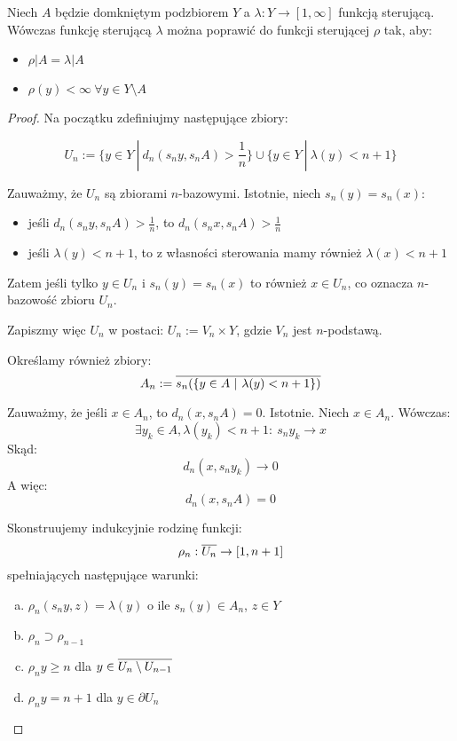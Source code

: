 \begin{thm}
Niech $A$ będzie domkniętym podzbiorem $Y$ a $\lambda: Y \rightarrow [1,\infty]$ funkcją sterującą. Wówczas funkcję sterującą $\lambda$ można poprawić do funkcji sterującej $\rho$ tak, aby:
\begin{itemize}
  \item $\rho|A = \lambda|A$
  \item $\rho(y) < \infty\ \forall y \in Y \setminus A$
\end{itemize}

\begin{proof}
  
  Na początku zdefiniujmy następujące zbiory:
  
  $$U_n := \{y \in Y\ |\ d_n(s_n y, s_n A) > \frac{1}{n}\} \cup \{y \in Y\ |\ \lambda(y) < n+1\}$$
  
  Zauważmy, że $U_n$ są zbiorami $n$-bazowymi. Istotnie, niech $s_n(y) = s_n(x)$:
  \begin{itemize}
    \item jeśli $d_n(s_n y, s_n A) > \frac{1}{n}$, to $d_n(s_n x, s_n A) > \frac{1}{n}$
    \item jeśli $\lambda(y) < n+1$, to z własności sterowania mamy również $\lambda(x) < n+1$
  \end{itemize}
  Zatem jeśli tylko $y \in U_n$ i $s_n(y) = s_n(x)$ to również $x \in U_n$, co oznacza $n$-bazowość zbioru $U_n$.
  
  Zapiszmy więc $U_n$ w postaci: $U_n := V_n \times Y$, gdzie $V_n$ jest $n$-podstawą.
  
  Określamy również zbiory:
  $$A_n := \overline{s_n({\{y \in A\ |\ \lambda(y) < n+1\}})}$$
  
  Zauważmy, że jeśli $x \in A_n$, to $d_n(x, s_n A) = 0$. Istotnie. Niech $x \in A_n$. Wówczas:
  $$\exists y_k \in A, \lambda(y_k) < n+1:\ s_n y_k \rightarrow x$$
  Skąd:
  $$d_n(x, s_n y_k) \rightarrow 0$$
  A więc:
  $$d_n(x, s_n A) = 0$$
  
  Skonstruujemy indukcyjnie rodzinę funkcji:
  $$\rho_n: \overline{U_n} \rightarrow [1, n+1]$$
  spełniających następujące warunki:
  \begin{enumerate}[(a)]
    \item \label{induction-1} $\rho_n(s_n y, z) = \lambda(y)$ o ile $s_n(y) \in A_n$, $z \in Y$
    \item \label{induction-2} $\rho_n \supset \rho_{n-1}$
    \item \label{induction-3} $\rho_n y \geq n$ dla $y \in \overline{U_n \setminus U_{n-1}}$
    \item \label{induction-4} $\rho_n y = n+1$ dla $y \in \partial U_n$
  \end{enumerate}
  

\end{proof}
\end{thm}
